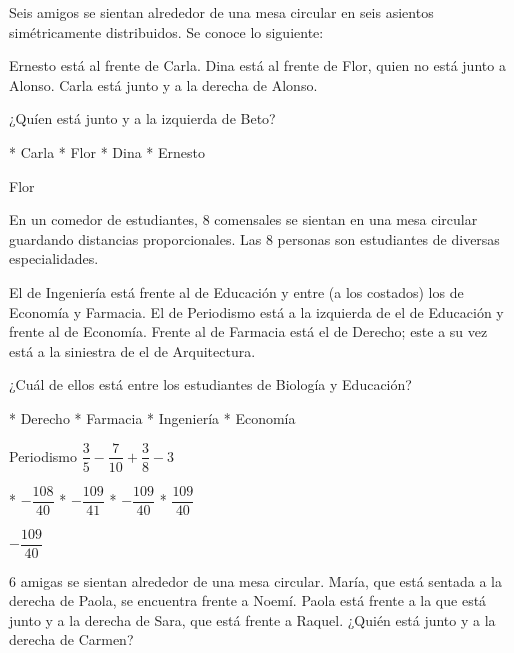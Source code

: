 \begin{minipage}{.8\linewidth}
	Seis amigos se sientan alrededor de una mesa circular en seis asientos sim\'etricamente distribuidos. Se conoce lo siguiente:
	\begin{itemize}
		\ii Ernesto est\'a al frente de Carla.
		\ii Dina est\'a al frente de Flor, quien no est\'a junto a Alonso.
		\ii Carla est\'a junto y a la derecha de Alonso.
	\end{itemize}
	¿Qu\'ien est\'a junto y a la izquierda de Beto?
\end{minipage}
\begin{minipage}{.7\linewidth}
	\begin{enum*}
		* Carla
		* Flor
		* Dina
		* Ernesto
	\end{enum*}
\end{minipage}
Flor
\begin{minipage}{.8\linewidth}
	En un comedor de estudiantes, $8$ comensales se sientan en una mesa circular guardando distancias proporcionales. Las $8$ personas son estudiantes de diversas especialidades.
	\begin{itemize}
		\ii El de Ingenier\'ia est\'a frente al de Educaci\'on y entre (a los costados) los de Econom\'ia y Farmacia.
		\ii El de Periodismo est\'a a la izquierda de el de Educaci\'on y frente al de Econom\'ia.
		\ii Frente al de Farmacia est\'a el de Derecho; este a su vez est\'a a la siniestra de el de Arquitectura.
	\end{itemize}
	¿Cu\'al de ellos est\'a entre los estudiantes de Biolog\'ia y Educaci\'on?
\end{minipage}
\begin{minipage}{.8\linewidth}
	\begin{enum*}
		* Derecho
		* Farmacia
		* Ingenier\'ia
		* Econom\'ia
	\end{enum*}
\end{minipage}
Periodismo
$\dfrac{3}{5}-\dfrac{7}{10}+\dfrac{3}{8}-3$
\begin{minipage}{.7\linewidth}
	\begin{enum*}
		* $-\dfrac{108}{40}$
		* $-\dfrac{109}{41}$
		* $-\dfrac{109}{40}$
		* $\dfrac{109}{40}$
	\end{enum*}
\end{minipage}
$-\dfrac{109}{40}$
\begin{minipage}{.7\linewidth}
	$6$ amigas se sientan alrededor de una mesa circular. Mar\'ia, que est\'a sentada a la derecha de Paola, se encuentra frente a Noem\'i. Paola est\'a frente a la que est\'a junto y a la derecha de Sara, que est\'a frente a Raquel. ¿Qui\'en est\'a junto y a la derecha de Carmen?
\end{minipage}
